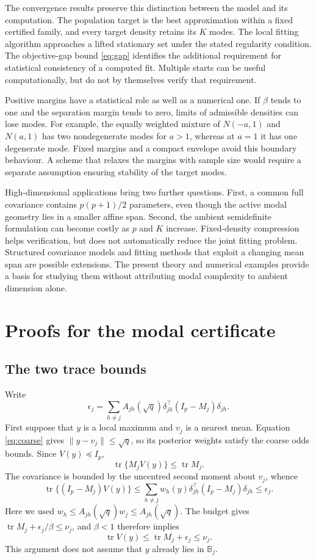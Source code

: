 \documentclass[12pt,a4paper]{article}
\theoremstyle{remark}
\DeclareMathOperator{\tr}{tr}
\begin{document}
The convergence results preserve this distinction between the model and its computation. The population target is the best approximation within a fixed certified family, and every target density retains its $K$ modes. The local fitting algorithm approaches a lifted stationary set under the stated regularity condition. The objective-gap bound \eqref{eq:gap} identifies the additional requirement for statistical consistency of a computed fit. Multiple starts can be useful computationally, but do not by themselves verify that requirement.

Positive margins have a statistical role as well as a numerical one. If $\beta$ tends to one and the separation margin tends to zero, limits of admissible densities can lose modes. For example, the equally weighted mixture of $N(-a,1)$ and $N(a,1)$ has two nondegenerate modes for $a>1$, whereas at $a=1$ it has one degenerate mode. Fixed margins and a compact envelope avoid this boundary behaviour. A scheme that relaxes the margins with sample size would require a separate assumption ensuring stability of the target modes.

High-dimensional applications bring two further questions. First, a common full covariance contains $p(p+1)/2$ parameters, even though the active modal geometry lies in a smaller affine span. Second, the ambient semidefinite formulation can become costly as $p$ and $K$ increase. Fixed-density compression helps verification, but does not automatically reduce the joint fitting problem. Structured covariance models and fitting methods that exploit a changing mean span are possible extensions. The present theory and numerical examples provide a basis for studying them without attributing modal complexity to ambient dimension alone.

\appendix

\section{Proofs for the modal certificate}\label{app:geometry}

\subsection{The two trace bounds}

Write
\[
 \epsilon_j=\sum_{h\ne j}A_{jh}(\sqrt q)
                   \delta_{jh}^\top(I_p-M_j)\delta_{jh}.
\]
First suppose that $y$ is a local maximum and $v_j$ is a nearest mean. Equation \eqref{eq:coarse} gives $\|y-v_j\|\le\sqrt q$, so its posterior weights satisfy the coarse odds bounds. Since $V(y)\preceq I_p$,
\[
 \tr\{M_jV(y)\}\le\tr M_j.
\]
The covariance is bounded by the uncentred second moment about $v_j$, whence
\[
 \tr\{(I_p-M_j)V(y)\}
 \le\sum_{h\ne j}w_h(y)\delta_{jh}^\top(I_p-M_j)\delta_{jh}
 \le\epsilon_j.
\]
Here we used $w_h\le A_{jh}(\sqrt q)w_j\le A_{jh}(\sqrt q)$.
The budget gives $\tr M_j+\epsilon_j/\beta\le\nu_j$, and $\beta<1$ therefore implies
\begin{equation}\label{eq:traceatmode}
 \tr V(y)\le\tr M_j+\epsilon_j\le\nu_j.
\end{equation}
This argument does not assume that $y$ already lies in $\mathbb B_j$.
\end{document}
